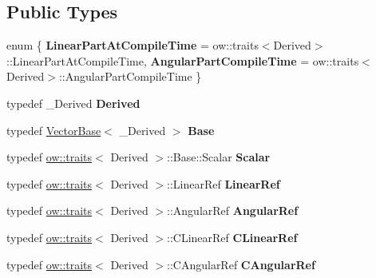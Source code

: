 \subsection*{Public Types}
\begin{DoxyCompactItemize}
\item 
enum \{ {\bfseries Linear\+Part\+At\+Compile\+Time} = ow\+:\+:traits$<$Derived$>$\+:\+:Linear\+Part\+At\+Compile\+Time, 
{\bfseries Angular\+Part\+Compile\+Time} = ow\+:\+:traits$<$Derived$>$\+:\+:Angular\+Part\+Compile\+Time
 \}\hypertarget{classow__core_1_1CartesianBase_a2edc02e98b4406fe43e4401d1a8aaf7c}{}\label{classow__core_1_1CartesianBase_a2edc02e98b4406fe43e4401d1a8aaf7c}

\item 
typedef \+\_\+\+Derived {\bfseries Derived}\hypertarget{classow__core_1_1CartesianBase_a13b052e1bc0c7ca566045e1f50627ab5}{}\label{classow__core_1_1CartesianBase_a13b052e1bc0c7ca566045e1f50627ab5}

\item 
typedef \hyperlink{classow__core_1_1VectorBase}{Vector\+Base}$<$ \+\_\+\+Derived $>$ {\bfseries Base}\hypertarget{classow__core_1_1CartesianBase_a7801aa055636a1eaf13605f55596327a}{}\label{classow__core_1_1CartesianBase_a7801aa055636a1eaf13605f55596327a}

\item 
typedef \hyperlink{structow_1_1traits}{ow\+::traits}$<$ Derived $>$\+::Base\+::\+Scalar {\bfseries Scalar}\hypertarget{classow__core_1_1CartesianBase_a2b162844fabaf1c3c4e0d6a45e42f800}{}\label{classow__core_1_1CartesianBase_a2b162844fabaf1c3c4e0d6a45e42f800}

\item 
typedef \hyperlink{structow_1_1traits}{ow\+::traits}$<$ Derived $>$\+::Linear\+Ref {\bfseries Linear\+Ref}\hypertarget{classow__core_1_1CartesianBase_a073e04ddd1cc9d166a63b3f35c675ed3}{}\label{classow__core_1_1CartesianBase_a073e04ddd1cc9d166a63b3f35c675ed3}

\item 
typedef \hyperlink{structow_1_1traits}{ow\+::traits}$<$ Derived $>$\+::Angular\+Ref {\bfseries Angular\+Ref}\hypertarget{classow__core_1_1CartesianBase_afc804342ec6667c68cdb6905a72f1676}{}\label{classow__core_1_1CartesianBase_afc804342ec6667c68cdb6905a72f1676}

\item 
typedef \hyperlink{structow_1_1traits}{ow\+::traits}$<$ Derived $>$\+::C\+Linear\+Ref {\bfseries C\+Linear\+Ref}\hypertarget{classow__core_1_1CartesianBase_ab49a3dd438b3f6c6c1b3e044cb5687fd}{}\label{classow__core_1_1CartesianBase_ab49a3dd438b3f6c6c1b3e044cb5687fd}

\item 
typedef \hyperlink{structow_1_1traits}{ow\+::traits}$<$ Derived $>$\+::C\+Angular\+Ref {\bfseries C\+Angular\+Ref}\hypertarget{classow__core_1_1CartesianBase_a6cda72d36c7de693694981014d1a0835}{}\label{classow__core_1_1CartesianBase_a6cda72d36c7de693694981014d1a0835}

\end{DoxyCompactItemize}
